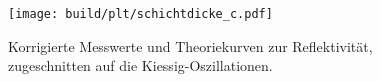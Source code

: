 \begin{figure}
    \centering
    \texttt{[image: build/plt/schichtdicke\_c.pdf]}
    \caption{
        Korrigierte Messwerte und Theoriekurven zur Reflektivität,
        zugeschnitten auf die Kiessig-Oszillationen.
    }
    \label{fig:plt:schichtdicke_c}
\end{figure}
